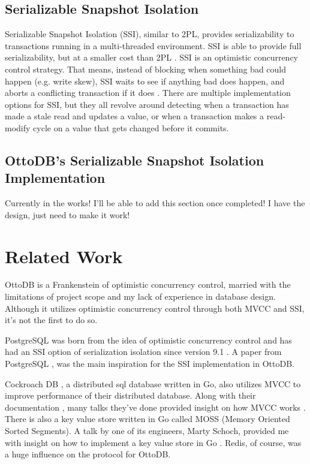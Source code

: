 \documentclass[conference]{IEEEtran}
\begin{document}
    \subsection{Serializable Snapshot Isolation}

    Serializable Snapshot Isolation (SSI), similar to 2PL, provides serializability to transactions running in a multi-threaded environment. SSI is able to provide full serializability, but at a smaller cost than 2PL \cite[p. 261]{b18}. SSI is an optimistic concurrency control strategy. That means, instead of blocking when something bad could happen (e.g. write skew), SSI waits to see if anything bad does happen, and aborts a conflicting transaction if it does \cite[p. 261]{b18}. There are multiple implementation options for SSI, but they all revolve around detecting when a transaction has made a stale read and updates a value, or when a transaction makes a read-modify cycle on a value that gets changed before it commits.

    \subsection{OttoDB's Serializable Snapshot Isolation Implementation}

    Currently in the works! I'll be able to add this section once completed! I have the design, just need to make it work!

    \section{Related Work}

    OttoDB is a Frankenstein of optimistic concurrency control, married with the limitations of project scope and my lack of experience in database design. Although it utilizes optimistic concurrency control through both MVCC and SSI, it's not the first to do so.
    
    PostgreSQL was born from the idea of optimistic concurrency control \cite{b25} and has had an SSI option of serialization isolation since version 9.1 \cite[p. 261]{b18}. A paper from PostgreSQL \cite{b25}, was the main inspiration for the SSI implementation in OttoDB.
    
    Cockroach DB \cite{b8}, a distributed sql database written in Go, also utilizes MVCC to improve performance of their distributed database. Along with their documentation \cite{b9,b10}, many talks they've done provided insight on how MVCC works \cite{b23, b24}. There is also a key value store written in Go called MOSS (Memory Oriented Sorted Segments). A talk by one of its engineers, Marty Schoch, provided me with insight on how to implement a key value store in Go \cite{b26}. Redis, of course, was a huge influence on the protocol for OttoDB. 
    
\end{document}
